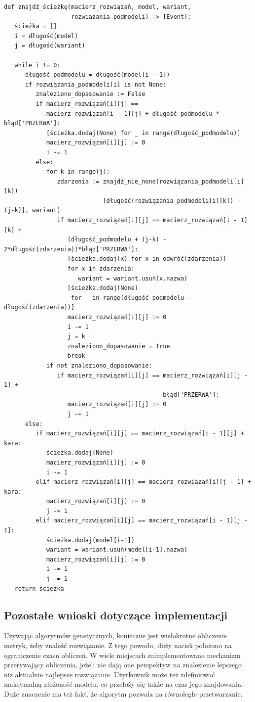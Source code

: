 \lstset{caption=Pseudokod znajdowania ścieżki w modelu, captionpos=b}
\lstset{label=src:traceback, frame=single}
\begin{lstlisting}[escapeinside=``]
def znajdź_ścieżkę(macierz_rozwiązań, model, wariant, 
                   rozwiązania_podmodeli) -> [Event]:
   ścieżka = []
   i = długość(model)
   j = długość(wariant) 
    
   while i != 0:
      długość_podmodelu = długość(model[i - 1])
      if rozwiązania_podmodeli[i] is not None:
         znaleziono_dopasowanie := False
         if macierz_rozwiązań[i][j] == 
            macierz_rozwiązań[i - 1][j] + długość_podmodelu * błąd['PRZERWA']:
            [ścieżka.dodaj(None) for _ in range(długość_podmodelu)]
            macierz_rozwiązań[i][j] := 0
            i -= 1
         else:
            for k in range(j):
               zdarzenia := znajdź_nie_none(rozwiązania_podmodeli[i][k])
                            [długość(rozwiązania_podmodeli[i][k]) - (j-k)], wariant)
               if macierz_rozwiązań[i][j] == macierz_rozwiązań[i - 1][k] + 
                  (długość_podmodelu + (j-k) - 2*długość(zdarzenia))*błąd['PRZERWA']:
                  [ścieżka.dodaj(x) for x in odwróć(zdarzenia)]
                  for x in zdarzenia:
                     wariant = wariant.usuń(x.nazwa)
                  [ścieżka.dodaj(None) 
                   for _ in range(długość_podmodelu - długość(zdarzenia))]
                  macierz_rozwiązań[i][j] := 0
                  i -= 1
                  j = k
                  znaleziono_dopasowanie = True
                  break
            if not znaleziono_dopasowanie:
               if macierz_rozwiązań[i][j] == macierz_rozwiązań[i][j - 1] + 
                                             błąd['PRZERWA']:
                  macierz_rozwiązań[i][j] := 0
                  j -= 1
      else:
         if macierz_rozwiązań[i][j] == macierz_rozwiązań[i - 1][j] + kara:
            ścieżka.dodaj(None)
            macierz_rozwiązań[i][j] := 0
            i -= 1
         elif macierz_rozwiązań[i][j] == macierz_rozwiązań[i][j - 1] + kara:
            macierz_rozwiązań[i][j] := 0
            j -= 1
         elif macierz_rozwiązań[i][j] == macierz_rozwiązań[i - 1][j - 1]:
            ścieżka.dodaj(model[i-1])
            wariant = wariant.usuń(model[i-1].nazwa)
            macierz_rozwiązań[i][j] := 0
            i -= 1 
            j -= 1
   return ścieżka
\end{lstlisting}

\subsection{Pozostałe wnioski dotyczące implementacji}
Używając algorytmów genetycznych, konieczne jest wielokrotne obliczenie metryk, żeby znaleźć rozwiązanie. Z tego powodu, duży nacisk położono na ograniczenie czasu obliczeń. W wiele miejscach zaimplementowano mechanizm przerywający obliczenia, jeżeli nie dają one perspektyw na znalezienie lepszego niż aktualnie najlepsze rozwiązanie. Użytkownik może też zdefiniować maksymalną złożoność modelu, co przełoży się także na czas jego znajdowania. Duże znaczenie ma też fakt, że algorytm pozwala na równoległe przetwarzanie. 

